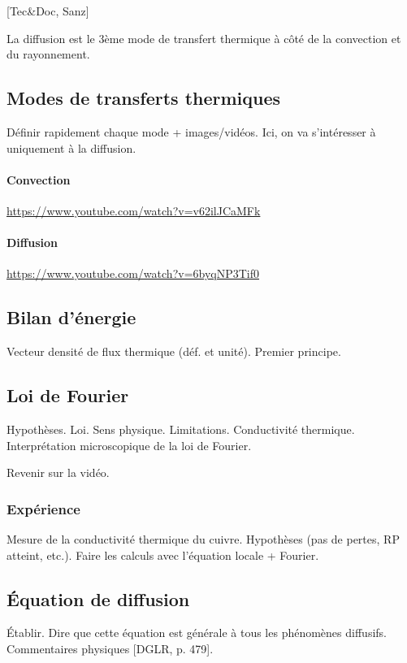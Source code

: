 \documentclass[11pt]{report}
\numberwithin{figure}{section}
\numberwithin{equation}{section}
\numberwithin{table}{section}
\newcommand{\1}{\boldsymbol{1}}
\begin{document}
[Tec\&Doc, Sanz]

La diffusion est le 3ème mode de transfert thermique à côté de la convection et du rayonnement.

\subsection{Modes de transferts thermiques}

Définir rapidement chaque mode + images/vidéos. Ici, on va s'intéresser à uniquement à la diffusion.


\paragraph{Convection} \url{https://www.youtube.com/watch?v=v62ilJCaMFk}

\paragraph{Diffusion} \url{https://www.youtube.com/watch?v=6byqNP3Tif0} 

\subsection{Bilan d'énergie}

Vecteur densité de flux thermique (déf. et unité). Premier principe.

\subsection{Loi de Fourier}

Hypothèses. Loi. Sens physique. Limitations. Conductivité thermique. Interprétation microscopique de la loi de Fourier.

Revenir sur la vidéo.

\subsubsection{Expérience} Mesure de la conductivité thermique du cuivre. Hypothèses (pas de pertes, RP atteint, etc.). Faire les calculs avec l'équation locale + Fourier. 

\subsection{Équation de diffusion}

Établir. Dire que cette équation est générale à tous les phénomènes diffusifs. Commentaires physiques [DGLR, p. 479].
\end{document}

